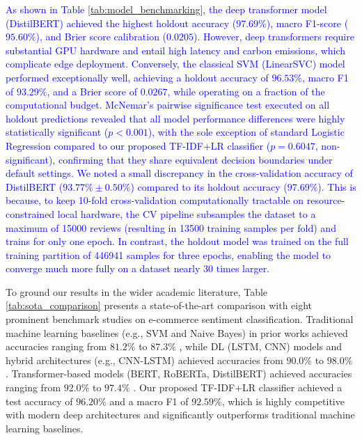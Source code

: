 \documentclass[authoryear,review,3p,times,12pt]{elsarticle}
\newcommand{\update}[1]{\textcolor{blue}{#1}}
\begin{document}
\update{As shown in Table \ref{tab:model_benchmarking}, the deep transformer model (DistilBERT) achieved the highest holdout accuracy ($97.69\%$), macro F1-score ($95.60\%$), and Brier score calibration ($0.0205$). However, deep transformers require substantial GPU hardware and entail high latency and carbon emissions, which complicate edge deployment. Conversely, the classical SVM (LinearSVC) model performed exceptionally well, achieving a holdout accuracy of $96.53\%$, macro F1 of $93.29\%$, and a Brier score of $0.0267$, while operating on a fraction of the computational budget. McNemar's pairwise significance test executed on all holdout predictions revealed that all model performance differences were highly statistically significant ($p < 0.001$), with the sole exception of standard Logistic Regression compared to our proposed TF-IDF+LR classifier ($p = 0.6047$, non-significant), confirming that they share equivalent decision boundaries under default settings. We noted a small discrepancy in the cross-validation accuracy of DistilBERT ($93.77\% \pm 0.50\%$) compared to its holdout accuracy ($97.69\%$). This is because, to keep 10-fold cross-validation computationally tractable on resource-constrained local hardware, the CV pipeline subsamples the dataset to a maximum of 15000 reviews (resulting in 13500 training samples per fold) and trains for only one epoch. In contrast, the holdout model was trained on the full training partition of 446941 samples for three epochs, enabling the model to converge much more fully on a dataset nearly 30 times larger.}

To ground our results in the wider academic literature, Table \ref{tab:sota_comparison} presents a state-of-the-art comparison with eight prominent benchmark studies on e-commerce sentiment classification. Traditional machine learning baselines (e.g., SVM and Naive Bayes) in prior works achieved accuracies ranging from $81.2\%$ to $87.3\%$ \citep{fang2015sentiment, ali2024analyzing}, while DL (LSTM, CNN) models and hybrid architectures (e.g., CNN-LSTM) achieved accuracies from $90.0\%$ to $98.0\%$ \citep{zhang2015characterlevel, sorour2024hybrid, mamyrbayev2026enhanced}. Transformer-based models (BERT, RoBERTa, DistilBERT) achieved accuracies ranging from $92.0\%$ to $97.4\%$ \citep{ali2024analyzing, duru2025transformer, daraghmi2026sentiment, khan2026assessing}. Our proposed TF-IDF+LR classifier achieved a test accuracy of $96.20\%$ and a macro F1 of $92.59\%$, which is highly competitive with modern deep architectures and significantly outperforms traditional machine learning baselines.
\end{document}
